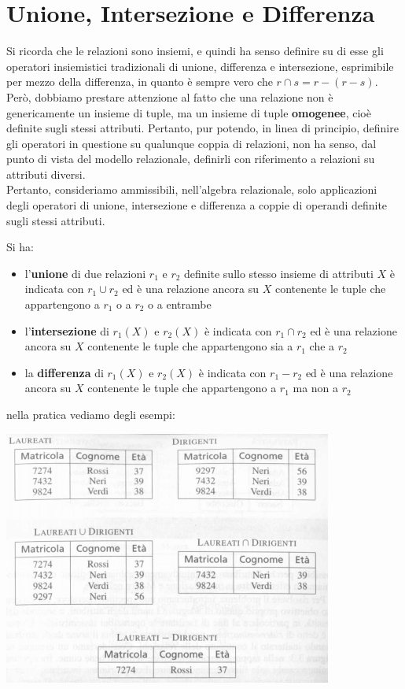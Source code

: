 \documentclass[a4paper,12pt, oneside]{book}
\begin{document}
\section{Unione, Intersezione  e Differenza}
Si ricorda che le relazioni sono insiemi, e quindi ha senso definire su
di esse gli operatori insiemistici tradizionali di unione, differenza e
intersezione, esprimibile per mezzo della differenza, in quanto è sempre
vero che $r\cap s = r-(r-s)$.\\
Però, dobbiamo prestare attenzione al fatto che una
relazione non è genericamente un insieme di tuple, ma un insieme di tuple
\textbf{omogenee}, cioè definite sugli stessi attributi.
Pertanto, pur potendo, in linea di principio,
definire gli operatori in questione su qualunque coppia di relazioni,
non ha senso, dal punto di vista del modello relazionale, definirli con
riferimento a relazioni su attributi diversi.\\
Pertanto, consideriamo ammissibili, nell'algebra relazionale, solo applicazioni degli operatori di unione,
intersezione e differenza a coppie di operandi definite sugli stessi attributi.
\begin{descrizione}
Si ha:
\begin{itemize}
\item l'\textbf{unione} di due relazioni $r_1$ e $r_2$ definite sullo stesso insieme di
  attributi $X$ è indicata con $r_1\cup r_2$ ed è una relazione ancora su $X$
  contenente le tuple che appartengono a $r_1$ o a $r_2$ o a entrambe
\item l'\textbf{intersezione} di $r_1(X)$ e $r_2(X)$ è indicata con $r_1\cap r_2$ ed è una relazione ancora su $X$
  contenente le tuple che appartengono sia a $r_1$ che a $r_2$
\item la \textbf{differenza} di  $r_1(X)$ e $r_2(X)$  è indicata con $r_1- r_2$ ed è una relazione ancora su $X$
  contenente le tuple che appartengono a $r_1$ ma non a $r_2$
\end{itemize}
\end{descrizione}
nella pratica vediamo degli esempi:
\begin{center}
\includegraphics[scale=1]{img/alg.png}
\end{center}
\end{document}

